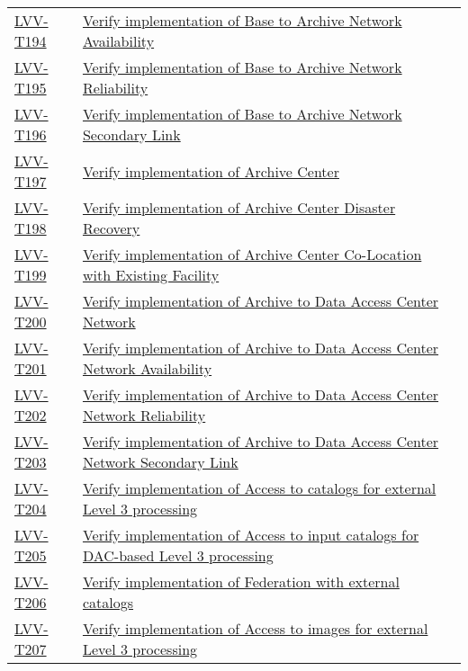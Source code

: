 \begin{longtable}[]{p{3cm}p{13cm}}
    \hyperref[lvv-t194]{LVV-T194} &
    \href{https://jira.lsstcorp.org/secure/Tests.jspa\#/testCase/LVV-T194}{Verify implementation of Base to Archive Network Availability} \tabularnewline
    \hyperref[lvv-t195]{LVV-T195} &
    \href{https://jira.lsstcorp.org/secure/Tests.jspa\#/testCase/LVV-T195}{Verify implementation of Base to Archive Network Reliability} \tabularnewline
    \hyperref[lvv-t196]{LVV-T196} &
    \href{https://jira.lsstcorp.org/secure/Tests.jspa\#/testCase/LVV-T196}{Verify implementation of Base to Archive Network Secondary Link} \tabularnewline
    \hyperref[lvv-t197]{LVV-T197} &
    \href{https://jira.lsstcorp.org/secure/Tests.jspa\#/testCase/LVV-T197}{Verify implementation of Archive Center} \tabularnewline
    \hyperref[lvv-t198]{LVV-T198} &
    \href{https://jira.lsstcorp.org/secure/Tests.jspa\#/testCase/LVV-T198}{Verify implementation of  Archive Center Disaster Recovery} \tabularnewline
    \hyperref[lvv-t199]{LVV-T199} &
    \href{https://jira.lsstcorp.org/secure/Tests.jspa\#/testCase/LVV-T199}{Verify implementation of Archive Center Co-Location with Existing Facility} \tabularnewline
    \hyperref[lvv-t200]{LVV-T200} &
    \href{https://jira.lsstcorp.org/secure/Tests.jspa\#/testCase/LVV-T200}{Verify implementation of Archive to Data Access Center Network} \tabularnewline
    \hyperref[lvv-t201]{LVV-T201} &
    \href{https://jira.lsstcorp.org/secure/Tests.jspa\#/testCase/LVV-T201}{Verify implementation of Archive to Data Access Center Network Availability} \tabularnewline
    \hyperref[lvv-t202]{LVV-T202} &
    \href{https://jira.lsstcorp.org/secure/Tests.jspa\#/testCase/LVV-T202}{Verify implementation of Archive to Data Access Center Network Reliability} \tabularnewline
    \hyperref[lvv-t203]{LVV-T203} &
    \href{https://jira.lsstcorp.org/secure/Tests.jspa\#/testCase/LVV-T203}{Verify implementation of Archive to Data Access Center Network Secondary Link} \tabularnewline
    \hyperref[lvv-t204]{LVV-T204} &
    \href{https://jira.lsstcorp.org/secure/Tests.jspa\#/testCase/LVV-T204}{Verify implementation of Access to catalogs for external Level 3 processing} \tabularnewline
    \hyperref[lvv-t205]{LVV-T205} &
    \href{https://jira.lsstcorp.org/secure/Tests.jspa\#/testCase/LVV-T205}{Verify implementation of Access to input catalogs for DAC-based Level 3 processing} \tabularnewline
    \hyperref[lvv-t206]{LVV-T206} &
    \href{https://jira.lsstcorp.org/secure/Tests.jspa\#/testCase/LVV-T206}{Verify implementation of Federation with external catalogs} \tabularnewline
    \hyperref[lvv-t207]{LVV-T207} &
    \href{https://jira.lsstcorp.org/secure/Tests.jspa\#/testCase/LVV-T207}{Verify implementation of Access to images for external Level 3 processing} \tabularnewline

\end{longtable}

